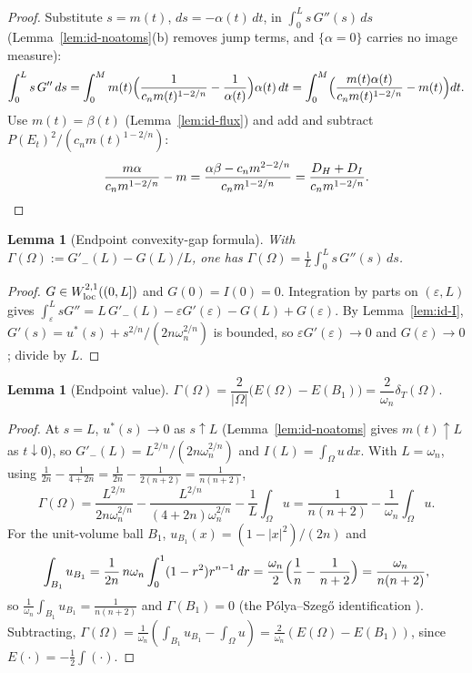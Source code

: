 \documentclass[11pt]{amsart}
\newtheorem{lemma}[theorem]{Lemma}
\theoremstyle{definition}
\newcommand{\Om}{\Omega}
\newcommand{\dT}{\delta_T}
\newcommand{\eps}{\varepsilon}
\newcommand{\Per}{P}
\begin{document}
\begin{proof}
Substitute \(s=m(t)\), \(ds=-\alpha(t)\,dt\), in
\(\int_0^L s\,G''(s)\,ds\) (Lemma~\ref{lem:id-noatoms}(b) removes jump terms,
and \(\{\alpha=0\}\) carries no image measure):
\[
   \int_0^L s\,G''\,ds
   =\int_0^M m(t)\Bigl(\frac{1}{c_n m(t)^{1-2/n}}-\frac1{\alpha(t)}\Bigr)
      \alpha(t)\,dt
   =\int_0^M\Bigl(\frac{m(t)\alpha(t)}{c_n m(t)^{1-2/n}}-m(t)\Bigr)dt .
\]
Use \(m(t)=\beta(t)\) (Lemma~\ref{lem:id-flux}) and add and subtract
\(\Per(E_t)^2/(c_n m(t)^{1-2/n})\):
\[
   \frac{m\alpha}{c_n m^{1-2/n}}-m
   =\frac{\alpha\beta-c_n m^{2-2/n}}{c_n m^{1-2/n}}
   =\frac{D_H+D_I}{c_n m^{1-2/n}} . \qedhere
\]
\end{proof}

\begin{lemma}[Endpoint convexity-gap formula]\label{lem:id-gap}
With \(\Gamma(\Om):=G'_-(L)-G(L)/L\), one has
\(\Gamma(\Om)=\frac1L\int_0^L s\,G''(s)\,ds\).
\end{lemma}

\begin{proof}
\(G\in W^{2,1}_{\rm loc}((0,L])\) and \(G(0)=I(0)=0\).  Integration by parts on
\((\eps,L)\) gives \(\int_\eps^L sG''=L\,G'_-(L)-\eps G'(\eps)-G(L)+G(\eps)\).
By Lemma~\ref{lem:id-I},
\(G'(s)=u^*(s)+s^{2/n}/(2n\omega_n^{2/n})\) is bounded, so
\(\eps G'(\eps)\to0\) and \(G(\eps)\to0\); divide by \(L\).
\end{proof}

\begin{lemma}[Endpoint value]\label{lem:id-endpoint}
\(\Gamma(\Om)=\dfrac{2}{|\Om|}\bigl(E(\Om)-E(B_1)\bigr)=\dfrac{2}{\omega_n}\dT(\Om).\)
\end{lemma}

\begin{proof}
At \(s=L\), \(u^*(s)\to0\) as \(s\uparrow L\) (Lemma~\ref{lem:id-noatoms} gives
\(m(t)\uparrow L\) as \(t\downarrow0\)), so \(G'_-(L)=L^{2/n}/(2n\omega_n^{2/n})\)
and \(I(L)=\int_\Om u\,dx\).  With \(L=\omega_n\), using
\(\frac{1}{2n}-\frac1{4+2n}=\frac{1}{2n}-\frac1{2(n+2)}=\frac1{n(n+2)}\),
\[
   \Gamma(\Om)
   =\frac{L^{2/n}}{2n\omega_n^{2/n}}-\frac{L^{2/n}}{(4+2n)\omega_n^{2/n}}
    -\frac1L\int_\Om u
   =\frac{1}{n(n+2)}-\frac1{\omega_n}\int_\Om u .
\]
For the unit-volume ball \(B_1\), \(u_{B_1}(x)=(1-|x|^2)/(2n)\) and
\[
   \int_{B_1}u_{B_1}
   =\frac1{2n}\,n\omega_n\int_0^1(1-r^2)r^{n-1}\,dr
   =\frac{\omega_n}{2}\Bigl(\frac1n-\frac1{n+2}\Bigr)
   =\frac{\omega_n}{n(n+2)},
\]
so \(\frac1{\omega_n}\int_{B_1}u_{B_1}=\frac1{n(n+2)}\) and \(\Gamma(B_1)=0\)
(the P\'olya--Szeg\H{o} identification \cite{PolyaSzego1951,Bandle1980}).
Subtracting, \(\Gamma(\Om)=\frac1{\omega_n}(\int_{B_1}u_{B_1}-\int_\Om u)
=\frac{2}{\omega_n}(E(\Om)-E(B_1))\), since \(E(\cdot)=-\tfrac12\int(\cdot)\).
\end{proof}
\end{document}
